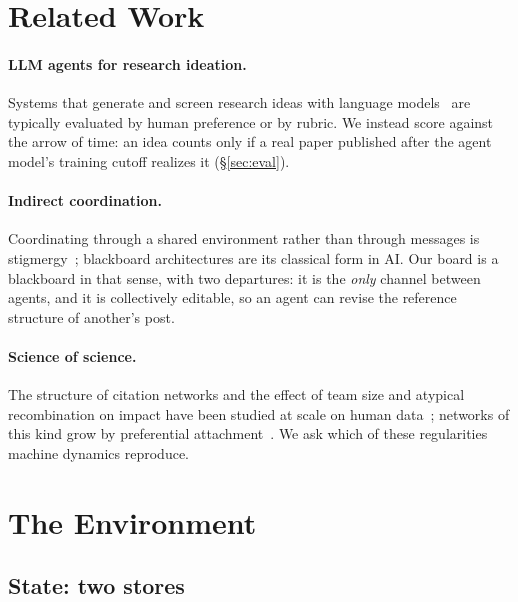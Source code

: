 \documentclass[sigconf,anonymous]{aamas}
\begin{document}
\section{Related Work}

\paragraph{LLM agents for research ideation.}
Systems that generate and screen research ideas with language
models~\cite{lu2024aiscientist,si2024llmideas} are typically evaluated by human
preference or by rubric. We instead score against the arrow of time: an idea
counts only if a real paper published after the agent model's training cutoff
realizes it (\S\ref{sec:eval}).

\paragraph{Indirect coordination.}
Coordinating through a shared environment rather than through messages is
stigmergy~\cite{theraulaz1999stigmergy}; blackboard architectures are its
classical form in AI. Our board is a blackboard in that sense, with two
departures: it is the \emph{only} channel between agents, and it is
collectively editable, so an agent can revise the reference structure of
another's post.

\paragraph{Science of science.}
The structure of citation networks and the effect of team size and atypical
recombination on impact have been studied at scale on human
data~\cite{fortunato2018science,uzzi2013atypical,wu2019teams}; networks of this
kind grow by preferential attachment~\cite{barabasi1999emergence}. We ask which
of these regularities machine dynamics reproduce.


\section{The Environment}

\subsection{State: two stores}
\end{document}
